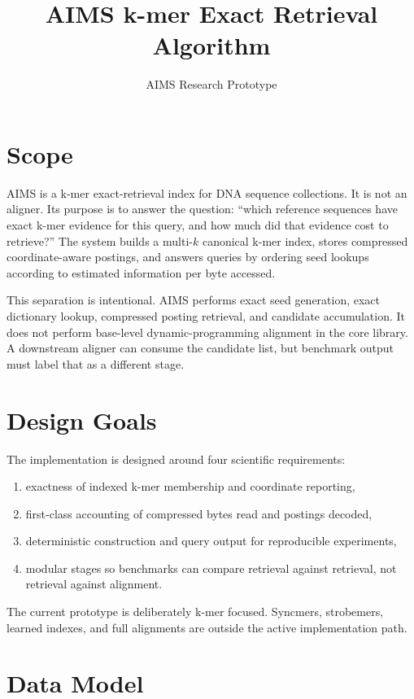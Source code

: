 \documentclass[11pt]{article}
\title{AIMS k-mer Exact Retrieval Algorithm}
\author{AIMS Research Prototype}
\date{}
\begin{document}
\maketitle

\section{Scope}

AIMS is a k-mer exact-retrieval index for DNA sequence collections. It is not an aligner. Its purpose is to answer the question: ``which reference sequences have exact k-mer evidence for this query, and how much did that evidence cost to retrieve?'' The system builds a multi-\(k\) canonical k-mer index, stores compressed coordinate-aware postings, and answers queries by ordering seed lookups according to estimated information per byte accessed.

This separation is intentional. AIMS performs exact seed generation, exact dictionary lookup, compressed posting retrieval, and candidate accumulation. It does not perform base-level dynamic-programming alignment in the core library. A downstream aligner can consume the candidate list, but benchmark output must label that as a different stage.

\section{Design Goals}

The implementation is designed around four scientific requirements:
\begin{enumerate}
  \item exactness of indexed k-mer membership and coordinate reporting,
  \item first-class accounting of compressed bytes read and postings decoded,
  \item deterministic construction and query output for reproducible experiments,
  \item modular stages so benchmarks can compare retrieval against retrieval, not retrieval against alignment.
\end{enumerate}

The current prototype is deliberately k-mer focused. Syncmers, strobemers, learned indexes, and full alignments are outside the active implementation path.

\section{Data Model}
\end{document}
